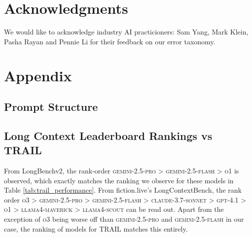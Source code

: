 \documentclass[11pt]{article}
\begin{document}
\section*{Acknowledgments}
We would like to acknowledge industry AI practicioners: Sam Yang, Mark Klein, Pasha Rayan and Pennie Li for their feedback on our error taxonomy.  




\appendix

\section{Appendix}
\label{sec:appendix}

\subsection{Prompt Structure}
\label{appendix_subsec:prompt_structure}


\subsection{Long Context Leaderboard Rankings vs TRAIL}
\label{appendix_subsec:longcontext_leaderboard_ranks}

From LongBenchv2, the rank-order \textsc{gemini-2.5-pro} > \textsc{gemini-2.5-flash} > \textsc{o1} is observed, which exactly matches the ranking we observe for these models in Table \ref{tab:trail_performance}. From fiction.live's LongContextBench, the rank order \textsc{o3} > \textsc{gemini-2.5-pro} > \textsc{gemini-2.5-flash} > \textsc{claude-3.7-sonnet} > \textsc{gpt-4.1} > \textsc{o1} > \textsc{llama4-maverick} > \textsc{llama4-scout} can be read out. Apart from the exception of \textsc{o3} being worse off than \textsc{gemini-2.5-pro} and \textsc{gemini-2.5-flash} in our case, the ranking of models for \textsc{TRAIL} matches this entirely.
\end{document}

